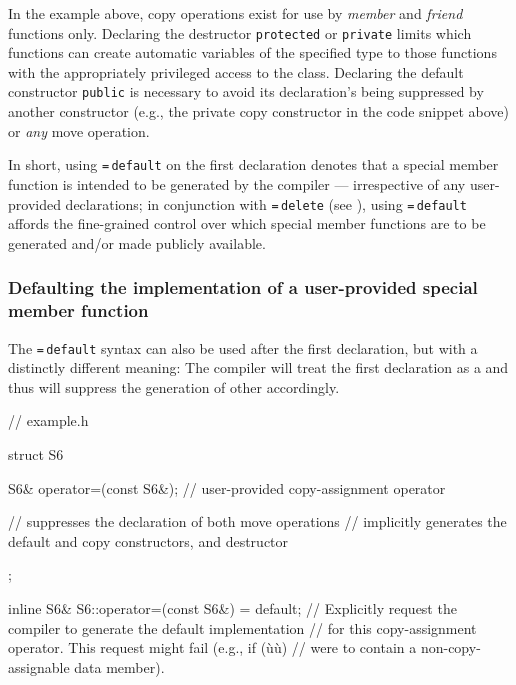 \noindent In the example above, copy operations exist for use by \emph{member} and
\emph{friend} functions only. Declaring the destructor
\lstinline!protected! or \lstinline!private! limits which functions can create
automatic variables of the specified type to those functions with the
appropriately privileged access to the class. Declaring the default
constructor \lstinline!public! is necessary to avoid its declaration's
being suppressed by another constructor (e.g., the private copy
constructor in the code snippet above) or \emph{any} move operation.

In short, using \lstinline!=!\,\lstinline!default! on the first declaration
denotes that a special member function is intended to be generated by
the compiler --- irrespective of any user-provided declarations; in
conjunction with {\lstinline!=!\,\lstinline!delete!} (see ),
using
\lstinline!=!\,\lstinline!default! affords the fine-grained control over which
special member functions are to be generated and/or made publicly
available.

\subsubsection[Defaulting the implementation of a user-provided special member function]{Defaulting the implementation of a user-provided special member function}\label{defaulting-the-implementation-of-a-user-provided-special-member-function}

The \lstinline!=!\,\lstinline!default! syntax can also be used after the first
declaration, but with a distinctly different meaning: The compiler will
treat the first declaration as a  and thus will suppress the generation of other
 accordingly.

\begin{emcppslisting}[language=C++,label=default-exampleh-code]
// example.h

struct S6
{
    S6& operator=(const S6&);  // user-provided copy-assignment operator

    // suppresses the declaration of both move operations
    // implicitly generates the default and copy constructors, and destructor
};

inline S6& S6::operator=(const S6&) = default;
    // Explicitly request the compiler to generate the default implementation
    // for this copy-assignment operator. This request might fail (e.g., if (ù{}ù)
    // were to contain a non-copy-assignable data member).
\end{emcppslisting}

